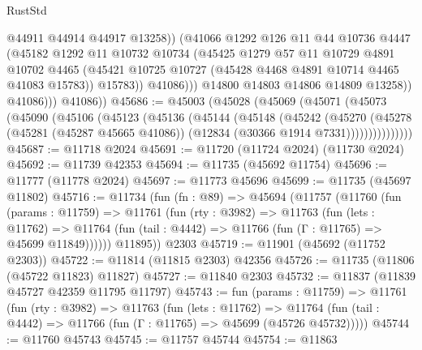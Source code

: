\begin{lexlean}{RustStd}
\begin{coremodule}
                          @44911
                          @44914
                          @44917
                          @13258))
                      (@41066
                        @1292
                        @126
                        @11
                        @44
                        @10736
                        @4447
                        (@45182
                          @1292
                          @11
                          @10732
                          @10734
                          (@45425
                            @1279
                            @57
                            @11
                            @10729
                            @4891
                            @10702
                            @4465
                            (@45421 @10725 @10727 (@45428 @4468 @4891 @10714 @4465 @41083 @15783))
                            @15783))
                        @41086)))
                  @14800
                  @14803
                  @14806
                  @14809
                  @13258))
              @41086)))
        @41086))
@45686 := @45003
    (@45028
      (@45069
        (@45071
          (@45073
            (@45090
              (@45106
                (@45123
                  (@45136
                    (@45144
                      (@45148
                        (@45242
                          (@45270
                            (@45278
                              (@45281 (@45287 @45665 @41086))
                              (@12834 (@30366 @1914 @7331)))))))))))))))
@45687 := @11718 @2024
@45691 := @11720 (@11724 @2024) (@11730 @2024)
@45692 := @11739 @42353
@45694 := @11735 (@45692 @11754)
@45696 := @11777 (@11778 @2024)
@45697 := @11773 @45696
@45699 := @11735 (@45697 @11802)
@45716 := @11734
    (fun (fn : @89) =>
    @45694
      (@11757
        (@11760
          (fun (params : @11759) =>
          @11761
            (fun (rty : @3982) =>
            @11763
              (fun (lets : @11762) =>
              @11764 (fun (tail : @4442) => @11766 (fun (Γ : @11765) => @45699 @11849))))))
        @11895))
    @2303
@45719 := @11901 (@45692 (@11752 @2303))
@45722 := @11814 (@11815 @2303) @42356
@45726 := @11735 (@11806 (@45722 @11823) @11827)
@45727 := @11840 @2303
@45732 := @11837 (@11839 @45727 @42359 @11795 @11797)
@45743 := fun (params : @11759) =>
  @11761
    (fun (rty : @3982) =>
    @11763
      (fun (lets : @11762) =>
      @11764 (fun (tail : @4442) => @11766 (fun (Γ : @11765) => @45699 (@45726 @45732)))))
@45744 := @11760 @45743
@45745 := @11757 @45744
@45754 := @11863

\end{coremodule}
\end{lexlean}
